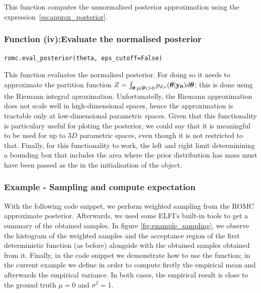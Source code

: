 This function computes the unnormalised posterior approximation using
the expression~\eqref{eq:approx_posterior}.

\subsubsection*{Function (iv):Evaluate the normalised posterior}
\vspace{5mm}
\noindent

\texttt{romc.eval_posterior(theta, eps_cutoff=False)}

This function evaluates the normalised posterior. For doing so it
needs to approximate the partition function
$Z = \int_{\boldsymbol{\theta} : p(\boldsymbol{\theta})>0}
p_{d,\epsilon}(\boldsymbol{\theta}|\mathbf{y_0})d\boldsymbol{\theta}$; this is done using the Riemann
integral aproximation. Unfortunatelly, the Riemann approximation does
not scale well in high-dimensional spaces, hence the approximation is
tractable only at low-dimensional parametric spaces. Given that this
functionality is particulary useful for ploting the posterior, we
could say that it is meaningful to be used for up to $3D$ parametric
spaces, even though it is not restricted to that. Finally, for this
functionality to work, the left and right limit determinining a
bounding box that includes the area where the prior distribution has
mass must have been passed as the  in the
initialisation of the  object.

\subsubsection*{Example - Sampling and compute expectation}

With the following code snippet, we perform weighted sampling from the
ROMC approximate posterior. Afterwards, we used some ELFI's built-in
tools to get a summary of the obtained samples. In figure
\ref{fig:example_sampling}, we observe the histogram of the weighted
samples and the acceptance region of the first deterministic function
(as before) alongside with the obtained samples obtained from
it. Finally, in the code snippet we demonstrate how to use the
 function; in the current example we
define  in order to compute firstly the empirical mean and
afterwards the empirical variance. In both cases, the empirical result
is close to the ground truth $\mu = 0$ and $\sigma^2 = 1$.

